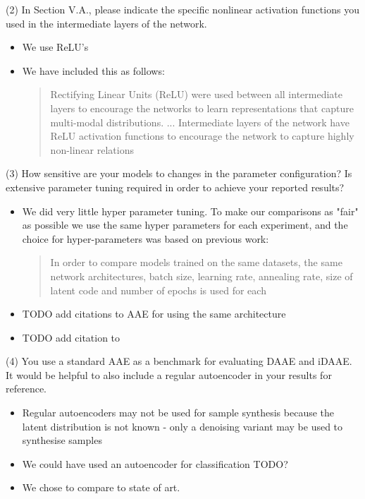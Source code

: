 \documentclass{article}
\begin{document}
{\color{blue}
(2) In Section V.A., please indicate the specific nonlinear activation functions you used in the intermediate layers of the network.}\newline

\begin{itemize}
    \item We use ReLU's
    \item We have included this as follows:
    \begin{quote}
        Rectifying Linear Units (ReLU) were used between all intermediate layers to encourage the networks to learn representations that capture multi-modal distributions. \newline
        ... \newline
        Intermediate layers of the network have ReLU activation functions to encourage the network to capture highly non-linear relations
    \end{quote}
\end{itemize}

{\color{blue}
(3) How sensitive are your models to changes in the parameter configuration? Is extensive parameter tuning required in order to achieve your reported results?}\newline

\begin{itemize}
    \item We did very little hyper parameter tuning. To make our comparisons as "fair" as possible we use the same hyper parameters for each experiment, and the choice for hyper-parameters was based on previous work:
    
    \begin{quote}
        In  order  to  compare  models trained on the same datasets, the same network architectures, batch size, learning rate, annealing rate, size of latent code and number of epochs is used for each
    \end{quote}
    
    \item TODO add citations to AAE for using the same architecture
    \item  TODO add citation to  
\end{itemize}

{\color{blue}
(4) You use a standard AAE as a benchmark for evaluating DAAE and iDAAE. It would be helpful to also include a regular autoencoder in your results for reference.}\newline

\begin{itemize}
    \item Regular autoencoders may not be used for sample synthesis because the latent distribution is not known - only a denoising variant may be used to synthesise samples
    \item We could have used an autoencoder for classification TODO? 
    \item We chose to compare to state of art.
\end{itemize}
\end{document}
